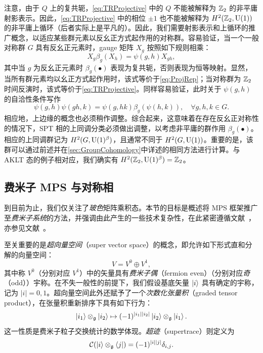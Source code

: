 注意，由于 $Q$ 上的复共轭，\cref{eq:TRProjective} 中的 $Q$ 不能被解释为 $\mathbb Z_2$ 的非平庸射影表示。因此，\cref{eq:TRProjective} 中的相位 $\pm 1$ 也不能被解释为 $H^2(\mathbb Z_2,{\rm U}(1))$ 的非平庸上循环（后者实际上是平凡的）。因此，我们需要射影表示和上循环的推广概念，以适应某些群元素以反幺正方式起作用的对称群。容易验证，当一个一般对称群 $G$ 具有反幺正元素时，gauge 矩阵 $X_g$ 按照如下规则相乘：
\begin{equation}
    X_g\beta_g(X_h) = \psi(g,h) X_{gh},
\end{equation}
其中当 $g$ 为反幺正元素时 $\beta_g(\bullet)$ 表现为复共轭，否则表现为恒等映射。显然，当所有群元素均以幺正方式起作用时，该式等价于\cref{eq:ProjRep}；当对称群为 $\mathbb Z_2$ 时间反演时，该式等价于\cref{eq:TRProjective}。同样容易验证，此时关于 $\psi(g,h)$ 的自洽性条件写作
\begin{equation}
    \psi(g,h)\psi(gh,k) = \psi(g,hk)\beta_g(\psi(h,k)), \quad \forall g,h,k\in G.
\end{equation}
相应地，上边缘的概念也必须稍作调整。综合起来，这意味着在存在反幺正对称性的情况下，SPT 相的上同调分类必须做出调整，以考虑非平庸的群作用 $\beta_g(\bullet)$。相应的上同调群记为 $H^2(G,{\rm U}(1)^\beta)$，且通常不同于 $H^2(G,{\rm U}(1))$。重要的是，该群可以通过前述并在\cref{sec:GroupCohomology}中详述的相同方法进行计算。与 AKLT 态的例子相对应，我们确实有 $H^2(\mathbb Z_2,{\rm U}(1)^\beta)=\mathbb Z_2$。
\subsection{费米子 MPS 与对称相}\label{sec:Fermions}
到目前为止，我们仅关注了\emph{玻色}矩阵乘积态。本节的目标是概述将 MPS 框架推广至\emph{费米子系统}的方法，并强调由此产生的一些技术复杂性，在此紧密遵循文献~\cite{Bultinck2016}，亦参见文献~\cite{Kapustin2016,Mortier2024}。

\bigskip\noindent 至关重要的是\emph{超向量空间}（super vector space）的概念，即允许如下形式直和分解的向量空间：
\begin{equation}
    V = V^0 \oplus V^1,
\end{equation}
其中称 $V^0$（分别对应 $V^1$）中的矢量具有\emph{费米子偶}（fermion even）（分别对应\emph{奇}（odd））宇称。在不失一般性的前提下，我们假设基底矢量 $\ket{i}$ 具有确定的宇称，记为 $\lvert i \rvert = 0,1$。超向量空间此外还赋予了一个\emph{次数化张量积}（graded tensor product），在张量积重新排序下具有如下行为：
\begin{equation}
    \ket{i_1} \otimes_\mathfrak{g} \ket{i_2} \mapsto (-1)^{\lvert i_1 \rvert \lvert i_2 \rvert} \ket{i_2} \otimes_\mathfrak{g} \ket{i_1}.
\end{equation}
这一性质是费米子粒子交换统计的数学体现。\emph{超迹}（supertrace）则定义为
\begin{equation}
    \mathcal C (\ket{i}\otimes_\mathfrak g \bra{j}) = (-1)^{\lvert i \rvert \lvert j \rvert} \delta_{i,j}.
\end{equation}

